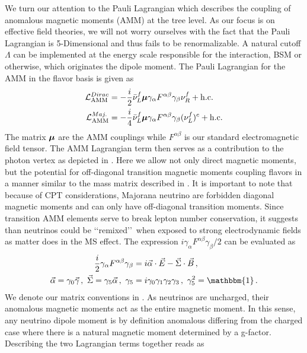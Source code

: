 We turn our attention to the Pauli Lagrangian which describes the coupling of anomalous magnetic moments (AMM) at the tree level. As our focus is on effective field theories, we will not worry ourselves with the fact that the Pauli Lagrangian is 5-Dimensional and thus fails to be renormalizable. A natural cutoff $\Lambda$ can be implemented at the energy scale responsible for the interaction, BSM or otherwise, which originates the dipole moment. The Pauli Lagrangian for the AMM in the flavor basis is given as
\begin{alignat}{1}
	\label{mass:eq:04a} \mathcal{L}_{\mathrm{AMM}}^{Dirac} &= -\frac{i}{2}\bar{\nu}^{f}_{L}\boldsymbol{\mu}\gamma_{\alpha}F^{\alpha\beta}\gamma_{\beta}\nu^{f}_{R}+\mathrm{h.c.}\\
	\label{mass:eq:0b} \mathcal{L}_{\mathrm{AMM}}^{Maj.} &= -\frac{i}{4}\bar{\nu}^{f}_{L}\boldsymbol{\mu}\gamma_{\alpha}F^{\alpha\beta}\gamma_{\beta}(\nu^{f}_{L})^{c}+\mathrm{h.c.}
\end{alignat}
The matrix $\boldsymbol{\mu}$ are the AMM couplings while $F^{\alpha\beta}$ is our standard electromagnetic field tensor. The AMM Lagrangian term then serves as a contribution to the photon vertex as depicted in . Here we allow not only direct magnetic moments, but the potential for off-diagonal transition magnetic moments coupling flavors in a manner similar to the mass matrix described in . It is important to note that because of CPT considerations, Majorana neutrino are forbidden diagonal magnetic moments and can only have off-diagonal transition moments. Since transition AMM elements serve to break lepton number conservation, it suggests than neutrinos could be \lq\lq remixed\rq\rq\ when exposed to strong electrodynamic fields as matter does in the MS effect. The expression $i\gamma_{\alpha}F^{\alpha\beta}\gamma_{\beta}/2$ can be evaluated as
\begin{alignat}{1}
	\label{mass:eq:04c} \frac{i}{2}\gamma_{\alpha}F^{\alpha\beta}\gamma_{\beta} &= i\vec{\alpha}\cdot\vec{E}-\vec{\Sigma}\cdot\vec{B}\,,\\
	\label{mass:eq:04d} \vec{\alpha} = \gamma_{0}\vec{\gamma}\,,\ \vec{\Sigma}=\gamma_{5}\vec{\alpha}\,,\ \gamma_{5}&=i\gamma_{0}\gamma_{1}\gamma_{2}\gamma_{3}\,,\ \gamma_{5}^{2}=\mathbbm{1}\,.
\end{alignat}
We denote our matrix conventions in . As neutrinos are uncharged, their anomalous magnetic moments act as the entire magnetic moment. In this sense, any neutrino dipole moment is by definition anomalous differing from the charged case where there is a natural magnetic moment determined by a g-factor. Describing the two Lagrangian terms together reads as
